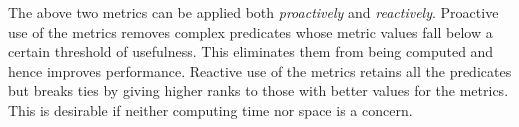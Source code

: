 The above two metrics can be applied both \emph{proactively} and \emph{reactively}.  Proactive use of the metrics removes complex predicates whose metric values fall below a certain threshold of usefulness.  This eliminates them from being computed and hence improves performance.  Reactive use of the metrics retains all the predicates but breaks ties by giving higher ranks to those with better values for the metrics. This is desirable if neither computing time nor space is a concern.
